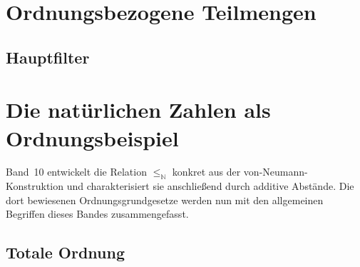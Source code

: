 \documentclass[main.tex]{subfiles}
\begin{document}
\chapter{Ordnungsbezogene Teilmengen}

\section{Hauptfilter}

\leavevmode\par\medskip

\begin{tabproof}
\end{tabproof}


\chapter{Die natürlichen Zahlen als Ordnungsbeispiel}

Band~10 entwickelt die Relation \(\leq_{\mathbb N}\) konkret aus der
von-Neumann-Konstruktion und charakterisiert sie anschließend durch additive
Abstände. Die dort bewiesenen Ordnungsgrundgesetze werden nun mit den
allgemeinen Begriffen dieses Bandes zusammengefasst.

\section{Totale Ordnung}
\end{document}
